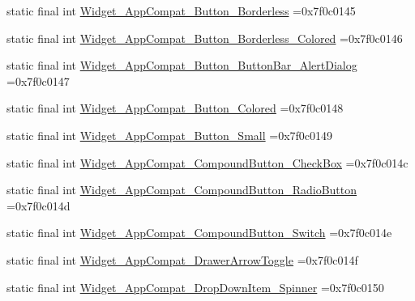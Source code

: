 \begin{DoxyCompactItemize}
\item 
static final int \mbox{\hyperlink{classbr_1_1unb_1_1cic_1_1mp_1_1marketmaster_1_1test_1_1R_1_1style_aaa14a6f116b0b3832702214b2c9dc5b7}{Widget\+\_\+\+App\+Compat\+\_\+\+Button\+\_\+\+Borderless}} =0x7f0c0145
\item 
static final int \mbox{\hyperlink{classbr_1_1unb_1_1cic_1_1mp_1_1marketmaster_1_1test_1_1R_1_1style_afe93a58c42d8a40fe211c5a44ee8008f}{Widget\+\_\+\+App\+Compat\+\_\+\+Button\+\_\+\+Borderless\+\_\+\+Colored}} =0x7f0c0146
\item 
static final int \mbox{\hyperlink{classbr_1_1unb_1_1cic_1_1mp_1_1marketmaster_1_1test_1_1R_1_1style_aa49eb7cd29fe73372677e6292716e946}{Widget\+\_\+\+App\+Compat\+\_\+\+Button\+\_\+\+Button\+Bar\+\_\+\+Alert\+Dialog}} =0x7f0c0147
\item 
static final int \mbox{\hyperlink{classbr_1_1unb_1_1cic_1_1mp_1_1marketmaster_1_1test_1_1R_1_1style_a25f960e2cfeba00c64119797e2a6b990}{Widget\+\_\+\+App\+Compat\+\_\+\+Button\+\_\+\+Colored}} =0x7f0c0148
\item 
static final int \mbox{\hyperlink{classbr_1_1unb_1_1cic_1_1mp_1_1marketmaster_1_1test_1_1R_1_1style_aa090faa7f544ae57356136953f41083d}{Widget\+\_\+\+App\+Compat\+\_\+\+Button\+\_\+\+Small}} =0x7f0c0149
\item 
static final int \mbox{\hyperlink{classbr_1_1unb_1_1cic_1_1mp_1_1marketmaster_1_1test_1_1R_1_1style_ae913be75f4bf340ff188ab1a0ae24bcb}{Widget\+\_\+\+App\+Compat\+\_\+\+Compound\+Button\+\_\+\+Check\+Box}} =0x7f0c014c
\item 
static final int \mbox{\hyperlink{classbr_1_1unb_1_1cic_1_1mp_1_1marketmaster_1_1test_1_1R_1_1style_a7f8247486cbb41513cf8ec23ba226d90}{Widget\+\_\+\+App\+Compat\+\_\+\+Compound\+Button\+\_\+\+Radio\+Button}} =0x7f0c014d
\item 
static final int \mbox{\hyperlink{classbr_1_1unb_1_1cic_1_1mp_1_1marketmaster_1_1test_1_1R_1_1style_a08fe7e34df7b6020c92a29acf6046dfd}{Widget\+\_\+\+App\+Compat\+\_\+\+Compound\+Button\+\_\+\+Switch}} =0x7f0c014e
\item 
static final int \mbox{\hyperlink{classbr_1_1unb_1_1cic_1_1mp_1_1marketmaster_1_1test_1_1R_1_1style_a510c656d2d2167db67f3e33868ed3097}{Widget\+\_\+\+App\+Compat\+\_\+\+Drawer\+Arrow\+Toggle}} =0x7f0c014f
\item 
static final int \mbox{\hyperlink{classbr_1_1unb_1_1cic_1_1mp_1_1marketmaster_1_1test_1_1R_1_1style_a654063b5db1442a569a78ddd24464bb5}{Widget\+\_\+\+App\+Compat\+\_\+\+Drop\+Down\+Item\+\_\+\+Spinner}} =0x7f0c0150

\end{DoxyCompactItemize}
